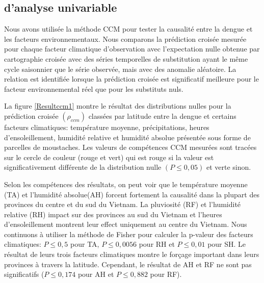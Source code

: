 \subsection{\Rs d'analyse univariable}

Nous avons utilisée la méthode CCM pour tester la causalité entre la dengue et les facteurs environnementaux. Nous comparons la prédiction croisée mesurée pour chaque facteur climatique d'observation avec l'expectation nulle obtenue par cartographie croisée avec des séries temporelles de substitution ayant le même cycle saisonnier que le série observée, mais avec des anomalie aléatoire. La relation est identifiée lorsque la prédiction croisée est significatif meilleure pour le facteur environnemental réel que pour les substituts nuls. 

La figure \ref{Resultccm1} montre le résultat des distributions nulles pour la prédiction croisée  $ (\rho_{ccm}) $ classées par latitude entre la dengue et certains facteurs climatiques: température moyenne, précipitations, heures d'ensoleillement, humidité relative et humidité absolue présentée sous forme de parcelles de moustaches. Les valeurs de compétences CCM mesurées sont tracées sur le cercle de couleur (rouge et vert) qui est rouge si la valeur est significativement différente de la distribution nulle $(P \leq 0,05)$ et verte sinon. 

Selon les compétences des résultats, on peut voir que le température moyenne (TA) et l'humidité absolue(AH) forcent fortement la causalité dans la plupart des provinces du centre et du sud du Vietnam. La pluviosité (RF) et l'humidité relative (RH) impact sur des provinces au sud du Vietnam et l'heures d'ensoleillement montrent leur  effect uniquement au centre du Vietnam. Nous continuons à utiliser la méthode de Fisher pour calculer la p-valeur des  facteurs climatiques: $P \leq 0,5$ pour TA, $P \leq 0,0056$ pour RH et $P\leq 0,01$ pour SH. Le résultat de leurs trois facteurs climatiques montre le forçage important dans leurs provinces à travers la latitude. Cependant, le résultat de AH et RF ne sont pas significatifs ($P \leq 0,174$ pour AH et $P \leq 0,882$ pour RF).


